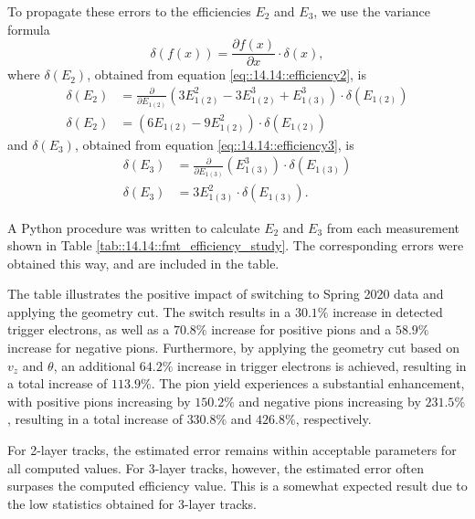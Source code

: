     To propagate these errors to the efficiencies $E_2$ and $E_3$, we use the variance formula
    \begin{equation*}
        \delta\left(f(x)\right) = \frac{\partial f(x)}{\partial x} \cdot \delta(x),
    \end{equation*}
    where $\delta(E_2)$, obtained from equation \eqref{eq::14.14::efficiency2}, is
    \begin{align*}
        \delta(E_2) &= \frac{\partial}{\partial E_{1(2)}} \left( 3E_{1(2)}^2 - 3E_{1(2)}^3 + E_{1(3)}^3 \right)
            \cdot \delta(E_{1(2)}) \\
        \delta(E_2) &= \left( 6E_{1(2)} - 9E_{1(2)}^2 \right) \cdot \delta(E_{1(2)})
    \end{align*}
    and $\delta(E_3)$, obtained from equation \eqref{eq::14.14::efficiency3}, is
    \begin{align*}
        \delta(E_3) &= \frac{\partial}{\partial E_{1(3)}} \left( E_{1(3)}^3 \right) \cdot \delta(E_{1(3)}) \\
        \delta(E_3) &= 3E_{1(3)}^2 \cdot \delta(E_{1(3)}).
    \end{align*}

    A Python procedure was written to calculate $E_2$ and $E_3$ from each measurement shown in Table \ref{tab::14.14::fmt_efficiency_study}.
    The corresponding errors were obtained this way, and are included in the table.

    The table illustrates the positive impact of switching to Spring 2020 data and applying the geometry cut.
    The switch results in a $30.1\%$ increase in detected trigger electrons, as well as a $70.8\%$ increase for positive pions and a $58.9\%$ increase for negative pions.
    Furthermore, by applying the geometry cut based on $v_z$ and $\theta$, an additional $64.2\%$ increase in trigger electrons is achieved, resulting in a total increase of $113.9\%$.
    The pion yield experiences a substantial enhancement, with positive pions increasing by $150.2\%$ and negative pions increasing by $231.5\%$, resulting in a total increase of $330.8\%$ and $426.8\%$, respectively.

    For 2-layer tracks, the estimated error remains within acceptable parameters for all computed values.
    For 3-layer tracks, however, the estimated error often surpases the computed efficiency value.
    This is a somewhat expected result due to the low statistics obtained for 3-layer tracks.

